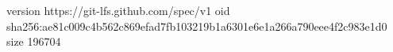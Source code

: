 version https://git-lfs.github.com/spec/v1
oid sha256:ae81c009c4b562c869efad7fb103219b1a6301e6e1a266a790eee4f2c983e1d0
size 196704
